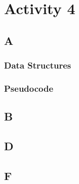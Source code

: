 \documentclass{article}
\begin{document}
\newpage
\section*{Activity 4}
\subsection*{A}
\subsubsection*{Data Structures}
\subsubsection*{Pseudocode}

\subsection*{B}

\subsection*{D}

\subsection*{F}
\end{document}
